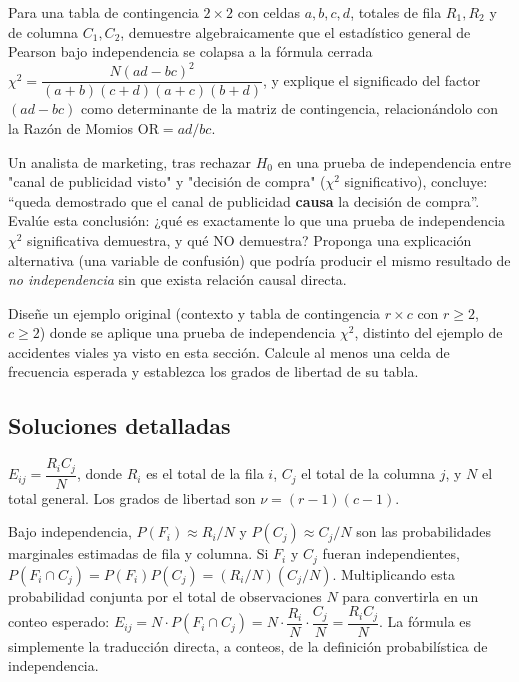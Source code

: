 \begin{problema}
	\label{prob:3c6b064}
	Para una tabla de contingencia $2\times2$ con celdas $a,b,c,d$, totales de fila $R_1,R_2$ y de columna $C_1,C_2$, demuestre algebraicamente que el estadístico general de Pearson bajo independencia se colapsa a la fórmula cerrada $\chi^2=\dfrac{N(ad-bc)^2}{(a+b)(c+d)(a+c)(b+d)}$, y explique el significado del factor $(ad-bc)$ como determinante de la matriz de contingencia, relacionándolo con la Razón de Momios $\text{OR}=ad/bc$.
\end{problema}

\begin{problema}
	\label{prob:878a46f}
	Un analista de marketing, tras rechazar $H_0$ en una prueba de independencia entre "canal de publicidad visto" y "decisión de compra" ($\chi^2$ significativo), concluye: ``queda demostrado que el canal de publicidad \textbf{causa} la decisión de compra''. Evalúe esta conclusión: ¿qué es exactamente lo que una prueba de independencia $\chi^2$ significativa demuestra, y qué NO demuestra? Proponga una explicación alternativa (una variable de confusión) que podría producir el mismo resultado de \emph{no independencia} sin que exista relación causal directa.
\end{problema}

\begin{problema}
	\label{prob:a5524c8}
	Diseñe un ejemplo original (contexto y tabla de contingencia $r\times c$ con $r\ge2$, $c\ge2$) donde se aplique una prueba de independencia $\chi^2$, distinto del ejemplo de accidentes viales ya visto en esta sección. Calcule al menos una celda de frecuencia esperada y establezca los grados de libertad de su tabla.
\end{problema}

\subsection*{Soluciones detalladas}

\begin{solproblema}[prob:d20c80f]
	$E_{ij} = \dfrac{R_i C_j}{N}$, donde $R_i$ es el total de la fila $i$, $C_j$ el total de la columna $j$, y $N$ el total general. Los grados de libertad son $\nu=(r-1)(c-1)$.
\end{solproblema}

\begin{solproblema}[prob:b002759]
	Bajo independencia, $P(F_i)\approx R_i/N$ y $P(C_j)\approx C_j/N$ son las probabilidades marginales estimadas de fila y columna. Si $F_i$ y $C_j$ fueran independientes, $P(F_i\cap C_j)=P(F_i)P(C_j) = (R_i/N)(C_j/N)$. Multiplicando esta probabilidad conjunta por el total de observaciones $N$ para convertirla en un conteo esperado: $E_{ij} = N\cdot P(F_i\cap C_j) = N\cdot\dfrac{R_i}{N}\cdot\dfrac{C_j}{N} = \dfrac{R_iC_j}{N}$. La fórmula es simplemente la traducción directa, a conteos, de la definición probabilística de independencia.
\end{solproblema}

